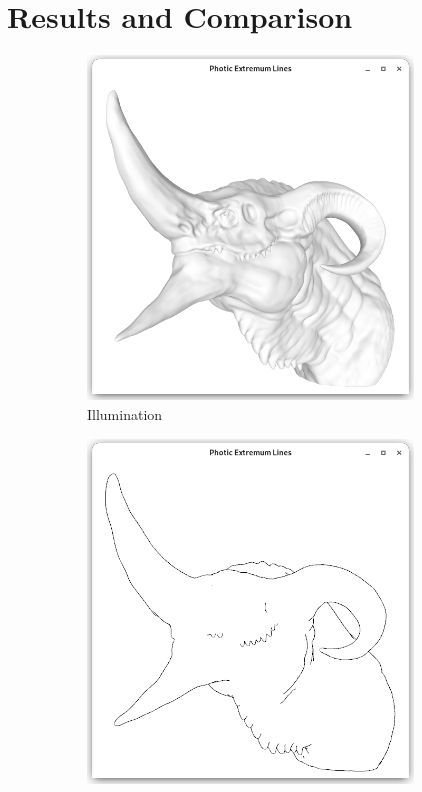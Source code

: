 \documentclass[9pt,fleqn,twoside,twocolumn]{stdglobal}
\begin{document}
\section{Results and Comparison}

  \begin{figure}
      \centering
      \begin{subfigure}[b]{0.24\textwidth}
        \centering
        \includegraphics[width=0.95\textwidth,trim={15px 15 15 50},clip]{images/dragon-head-viewer-shader.png}
        \caption{Illumination}
      \end{subfigure}%
      \hfill%
      \begin{subfigure}[b]{0.24\textwidth}
        \centering
        \includegraphics[width=0.95\textwidth,trim={15px 15 15 50},clip]{images/dragon-head-contours.png}

\end{subfigure}
\end{figure}
\end{document}
